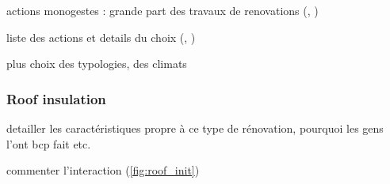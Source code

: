 \documentclass[11pt]{article}
\begin{document}
    actions monogestes : grande part des travaux de renovations (\cite{ademe_typologie_2019}, \cite{onre_renovation_2022})


    liste des actions et details du choix (\cite{i4ce_trajectoires_2023}, \cite{peuportier_resiliance_2023})

    plus choix des typologies, des climats

        \subsubsection{Roof insulation} %
        \label{ssub:roof_insulation}
        
            detailler les caractéristiques propre à ce type de rénovation, pourquoi les gens l'ont bcp fait etc. 

            commenter l'interaction (\ref{fig:roof_init})
\end{document}
